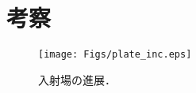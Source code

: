 ﻿\documentclass[11pt,a4j]{mybook2}
\begin{document}
\tableofcontents
\frontmatter
\mainmatter
	
	
%	
%	
\chapter{考察}
\begin{figure}[h]
	\begin{center}
	\texttt{[image: Figs/plate\_inc.eps]} 
	\end{center}
	\caption{
		入射場の進展．
	} 
	\label{fig:fig1}
\end{figure}
%	
\end{document}
